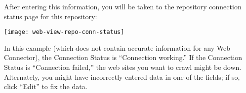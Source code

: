 After entering this information, you will be taken to the repository
connection status page for this repository:

\texttt{[image: web-view-repo-conn-status]}

In this example (which does not contain accurate information for any Web
Connector), the Connection Status is ``Connection working.''  If the
Connection Status is ``Connection failed,'' the web sites you want to
crawl might be down. Alternately, you might have incorrectly entered
data in one of the fields; if so, click ``Edit'' to fix the data.
